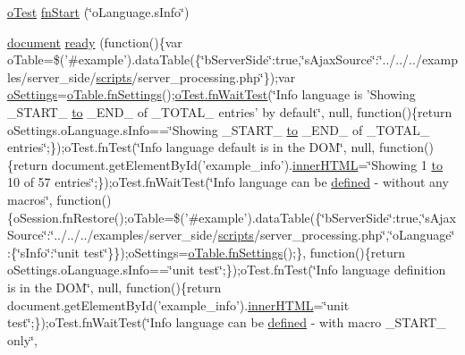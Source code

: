 \begin{DoxyCompactItemize}
\item 
\hyperlink{unit__test_8js_a3b2d259e2df3b6860d9047a92d09d0d6}{o\+Test} \hyperlink{4__server-side_2o_language_8s_info_8js_ae3ae069c6d0820975312356b628f122a}{fn\+Start} (\char`\"{}o\+Language.\+s\+Info\char`\"{})
\item 
\hyperlink{outside_events_8js_aa14f8e0338cced6720590fd2ea13bd4b}{document} \hyperlink{4__server-side_2o_language_8s_info_8js_a7434e13ac56f8b76228ddb943eadeb1f}{ready} (function()\{var o\+Table=\$('\#example').data\+Table(\{\char`\"{}b\+Server\+Side\char`\"{}\+:true,\char`\"{}s\+Ajax\+Source\char`\"{}\+:\char`\"{}../../../examples/server\+\_\+side/\hyperlink{tinymce_8jquery_8dev_8js_a09066d4d580eeec222f858d588b4cdef}{scripts}/server\+\_\+processing.\+php\char`\"{}\});var \hyperlink{model_8settings_8js_a4857b9c813b4dea010668e9555d0aca7}{o\+Settings}=\hyperlink{api_8methods_8js_a78f387fab92a85c2cb7830bc5d8a6141}{o\+Table.\+fn\+Settings}();\hyperlink{onhold_24__server-side_2__zero__config_8js_ab25c4d596771c0133cdc45178ce72c3d}{o\+Test.\+fn\+Wait\+Test}(\char`\"{}Info language is 'Showing \+\_\+\+S\+T\+A\+R\+T\+\_\+ \hyperlink{jquery-ui_8js_af6086621f45baa2cf538f19e45d3c263}{to} \+\_\+\+E\+N\+D\+\_\+ of \+\_\+\+T\+O\+T\+A\+L\+\_\+ entries' by default\char`\"{}, null, function()\{return o\+Settings.\+o\+Language.\+s\+Info==\char`\"{}Showing \+\_\+\+S\+T\+A\+R\+T\+\_\+ \hyperlink{jquery-ui_8js_af6086621f45baa2cf538f19e45d3c263}{to} \+\_\+\+E\+N\+D\+\_\+ of \+\_\+\+T\+O\+T\+A\+L\+\_\+ entries\char`\"{};\});o\+Test.\+fn\+Test(\char`\"{}Info language default is in the D\+O\+M\char`\"{}, null, function()\{return document.\+get\+Element\+By\+Id('example\+\_\+info').\hyperlink{jquery-ui_8js_a87f73c4f0391c1cf9fe60374a76d9a7b}{inner\+H\+T\+M\+L}=\char`\"{}Showing 1 \hyperlink{jquery-ui_8js_af6086621f45baa2cf538f19e45d3c263}{to} 10 of 57 entries\char`\"{};\});o\+Test.\+fn\+Wait\+Test(\char`\"{}Info language can be \hyperlink{tinymce_8js_a8cb6212cde9926d156ab5912c9b547cf}{defined} -\/ without any macros\char`\"{}, function()\{o\+Session.\+fn\+Restore();o\+Table=\$('\#example').data\+Table(\{\char`\"{}b\+Server\+Side\char`\"{}\+:true,\char`\"{}s\+Ajax\+Source\char`\"{}\+:\char`\"{}../../../examples/server\+\_\+side/\hyperlink{tinymce_8jquery_8dev_8js_a09066d4d580eeec222f858d588b4cdef}{scripts}/server\+\_\+processing.\+php\char`\"{},\char`\"{}o\+Language\char`\"{}\+:\{\char`\"{}s\+Info\char`\"{}\+:\char`\"{}unit test\char`\"{}\}\});o\+Settings=\hyperlink{api_8methods_8js_a78f387fab92a85c2cb7830bc5d8a6141}{o\+Table.\+fn\+Settings}();\}, function()\{return o\+Settings.\+o\+Language.\+s\+Info==\char`\"{}unit test\char`\"{};\});o\+Test.\+fn\+Test(\char`\"{}Info language definition is in the D\+O\+M\char`\"{}, null, function()\{return document.\+get\+Element\+By\+Id('example\+\_\+info').\hyperlink{jquery-ui_8js_a87f73c4f0391c1cf9fe60374a76d9a7b}{inner\+H\+T\+M\+L}=\char`\"{}unit test\char`\"{};\});o\+Test.\+fn\+Wait\+Test(\char`\"{}Info language can be \hyperlink{tinymce_8js_a8cb6212cde9926d156ab5912c9b547cf}{defined} -\/ with macro \+\_\+\+S\+T\+A\+R\+T\+\_\+ only\char`\"{}, 
\end{DoxyCompactItemize}
